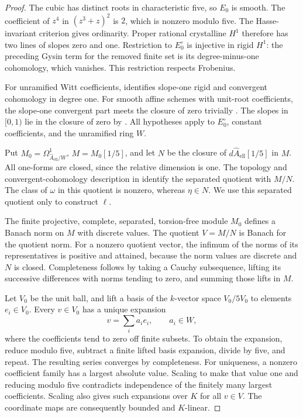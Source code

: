 \documentclass[11pt,a4paper]{amsart}
\numberwithin{equation}{section}
\theoremstyle{definition}
\theoremstyle{remark}
\newcommand{\Dtwowh}{\widehat}
\begin{document}
\begin{proof}
The cubic has distinct roots in characteristic five, so \(E_0\) is
smooth. The coefficient of \(z^4\) in \((z^3+z)^2\) is \(2\),
which is nonzero modulo five.
The Hasse-invariant criterion
\cite[Theorem~V.4.1(a), p.~148]{SilvermanAEC2009} gives ordinarity.
Proper rational crystalline \(H^1\) therefore has two lines of
slopes zero and one.
Restriction to \(E_0^\circ\) is injective in rigid \(H^1\):
the preceding Gysin term for the removed finite set is its
degree-minus-one cohomology, which vanishes.
This restriction respects Frobenius.

For unramified Witt coefficients,
\cite[Theorem~7.3.1]{CaroDAddezio2025} identifies slope-one rigid and
convergent cohomology in degree one.
For smooth affine schemes with unit-root coefficients, the
slope-one convergent part meets the closure of zero trivially
\cite[Theorem~7.3.6]{CaroDAddezio2025}.
The slopes in \([0,1)\) lie in the closure of zero by
\cite[Theorem~7.2.1]{CaroDAddezio2025}.
All hypotheses apply to \(E_0^\circ\), constant coefficients, and
the unramified ring \(W\).

Put \(M_0=\Omega^1_{\Dtwowh A_{\mathrm{ell}}/W}\), \(M=M_0[1/5]\),
and let \(N\) be the closure of
\(d\Dtwowh A_{\mathrm{ell}}[1/5]\) in \(M\).
All one-forms are closed, since the relative dimension is one.
The topology and convergent-cohomology description in
\cite[Definition~7.1.1]{CaroDAddezio2025} identify the separated
quotient with \(M/N\).
The class of \(\omega\) in this quotient is nonzero, whereas
\(\eta\in N\).
We use this separated quotient only to construct \(\ell\).

The finite projective, complete, separated, torsion-free module
\(M_0\) defines a Banach norm on \(M\) with discrete values.
The quotient \(V=M/N\) is Banach for the quotient norm.
For a nonzero quotient vector, the infimum of the norms of its
representatives is positive and attained, because the norm values
are discrete and \(N\) is closed.
Completeness follows by taking a Cauchy subsequence, lifting its
successive differences with norms tending to zero, and summing
those lifts in \(M\).

Let \(V_0\) be the unit ball, and lift a basis of the \(k\)-vector
space \(V_0/5V_0\) to elements \(e_i\in V_0\).
Every \(v\in V_0\) has a unique expansion
\[
 v=\sum_i a_ie_i,\qquad a_i\in W,
\]
where the coefficients tend to zero off finite subsets.
To obtain the expansion, reduce modulo five, subtract a finite
lifted basis expansion, divide by five, and repeat.
The resulting series converges by completeness.
For uniqueness, a nonzero coefficient family has a largest absolute
value. Scaling to make that value one and reducing modulo five
contradicts independence of the finitely many largest coefficients.
Scaling also gives such expansions over \(K\) for all \(v\in V\).
The coordinate maps are consequently bounded and \(K\)-linear.


\end{proof}
\end{document}
